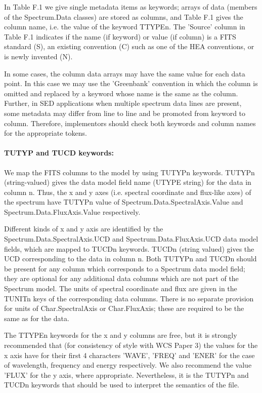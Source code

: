 In Table F.1 we give single metadata items as keywords; arrays
of data (members of the Spectrum.Data classes) are stored as
columns, and Table F.1 gives the column name, i.e. the value
of the keyword TTYPEn. The 'Source' column in Table F.1 indicates
if the name (if keyword) or value (if column) 
is a FITS standard (S), an existing convention (C) such
as one of the HEA conventions, or is newly invented (N).

In some cases, the column data arrays may have the same value for each
data point. In this case we may use the 'Greenbank' convention in which
the column is omitted and replaced by a keyword whose name is the same
as the column.  Further, in SED applications when multiple spectrum
data lines are present, some metadata may differ from line to line and
be promoted from keyword to column.
Therefore, implementors should  check both keywords and
column names for the appropriate tokens.





\paragraph {\bf TUTYP and TUCD keywords:}
We map the FITS columns to the model by using TUTYPn keywords.
TUTYPn (string-valued) gives the data model field name (UTYPE string)
for the data in column n. Thus, the x and y axes (i.e. spectral coordinate
and flux-like axes) of the spectrum
have TUTYPn value of Spectrum.Data.SpectralAxis.Value and
Spectrum.Data.FluxAxis.Value respectively. 


Different kinds of x and y axis are identified by the
Spectrum.Data.SpectralAxis.UCD and Spectrum.Data.FluxAxis.UCD data model
fields, which are mapped to TUCDn keywords. TUCDn (string valued) gives
the UCD corresponding to the data in column n. Both TUTYPn and TUCDn
should be present for any column which corresponds to a Spectrum data model
field; they are optional for any additional data columns which are not part
of the Spectrum model.
The units of spectral coordinate and flux
are given in the TUNITn keys of the corresponding data columns.
There is no separate provision for units of Char.SpectralAxis or
Char.FluxAxis; these are required to be the same as for the data.


The TTYPEn keywords
for the x and y columns are free, but it is strongly recommended that
(for consistency of style with WCS Paper 3) the values for the
x axis have for their first 4 characters 'WAVE', 'FREQ' and 'ENER'
for the case of wavelength, frequency and energy respectively.
We also recommend the value 'FLUX' for the y axis, where appropriate.
Nevertheless, it is the TUTYPn and TUCDn keywords that should be
used to interpret the semantics of the file.


